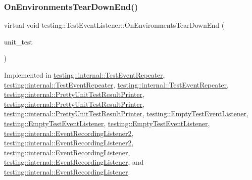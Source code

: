 \subsubsection{\texorpdfstring{OnEnvironmentsTearDownEnd()}{OnEnvironmentsTearDownEnd()}\hspace{0.1cm}{\footnotesize\ttfamily [2/3]}}
{\footnotesize\ttfamily virtual void testing\+::\+Test\+Event\+Listener\+::\+On\+Environments\+Tear\+Down\+End (\begin{DoxyParamCaption}\item[{const \mbox{\hyperlink{classtesting_1_1_unit_test}{Unit\+Test}} \&}]{unit\+\_\+test }\end{DoxyParamCaption})\hspace{0.3cm}{\ttfamily [pure virtual]}}



Implemented in \mbox{\hyperlink{classtesting_1_1internal_1_1_test_event_repeater_a0bc5fc45653d32b5e1bcad059ee7616b}{testing\+::internal\+::\+Test\+Event\+Repeater}}, \mbox{\hyperlink{classtesting_1_1internal_1_1_test_event_repeater_a0bc5fc45653d32b5e1bcad059ee7616b}{testing\+::internal\+::\+Test\+Event\+Repeater}}, \mbox{\hyperlink{classtesting_1_1internal_1_1_test_event_repeater_a8428220c4cf9f0cea2dfd9a70f07ab7f}{testing\+::internal\+::\+Test\+Event\+Repeater}}, \mbox{\hyperlink{classtesting_1_1internal_1_1_pretty_unit_test_result_printer_a6700b0664749940a93917c5dcc3b90ed}{testing\+::internal\+::\+Pretty\+Unit\+Test\+Result\+Printer}}, \mbox{\hyperlink{classtesting_1_1internal_1_1_pretty_unit_test_result_printer_a6700b0664749940a93917c5dcc3b90ed}{testing\+::internal\+::\+Pretty\+Unit\+Test\+Result\+Printer}}, \mbox{\hyperlink{classtesting_1_1internal_1_1_pretty_unit_test_result_printer_ab23094ef3b714778b2f742d39818c280}{testing\+::internal\+::\+Pretty\+Unit\+Test\+Result\+Printer}}, \mbox{\hyperlink{classtesting_1_1_empty_test_event_listener_ad9984052e82c3ae26395a2d9480326d2}{testing\+::\+Empty\+Test\+Event\+Listener}}, \mbox{\hyperlink{classtesting_1_1_empty_test_event_listener_ad9984052e82c3ae26395a2d9480326d2}{testing\+::\+Empty\+Test\+Event\+Listener}}, \mbox{\hyperlink{classtesting_1_1_empty_test_event_listener_aea64c83c415b33a4c0b0239bafd1438d}{testing\+::\+Empty\+Test\+Event\+Listener}}, \mbox{\hyperlink{classtesting_1_1internal_1_1_event_recording_listener2_ac0c920b1264e59dfa7e8c9d159a77e8b}{testing\+::internal\+::\+Event\+Recording\+Listener2}}, \mbox{\hyperlink{classtesting_1_1internal_1_1_event_recording_listener2_ac0c920b1264e59dfa7e8c9d159a77e8b}{testing\+::internal\+::\+Event\+Recording\+Listener2}}, \mbox{\hyperlink{classtesting_1_1internal_1_1_event_recording_listener_ab96b8b58a318ebe79df4295e2da6a289}{testing\+::internal\+::\+Event\+Recording\+Listener}}, \mbox{\hyperlink{classtesting_1_1internal_1_1_event_recording_listener_ab96b8b58a318ebe79df4295e2da6a289}{testing\+::internal\+::\+Event\+Recording\+Listener}}, and \mbox{\hyperlink{classtesting_1_1internal_1_1_event_recording_listener_acd5a3dc070265166a7da68222031fd61}{testing\+::internal\+::\+Event\+Recording\+Listener}}.

